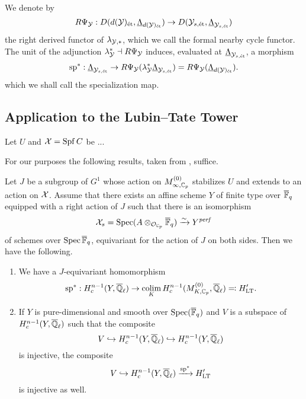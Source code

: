 \documentclass[../main.tex]{subfiles}
\begin{document}
\begin{defi}\label{def:FormalNearbyCycleFunctor}
  We denote by
  \begin{equation*}
    R \Psi_{\mathcal{Y}}: D(d(\mathcal{Y})_{\textnormal{\'et}}, {\underline \Lambda_{d(\mathcal{Y})_{\textnormal{\'et}}}}) \to
    D(\mathcal{Y}_{s, \textnormal{\'et}},{\underline \Lambda_{\mathcal{Y}_{s, \textnormal{\'et}}}})
  \end{equation*}
  the right derived functor of $\lambda_{\mathcal{Y},*}$, which we call the formal nearby
  cycle functor. The unit of the adjunction $\lambda_{\mathcal{Y}}^* \dashv 
  R \Psi_{\mathcal{Y}}$ induces, evaluated at $\underline \Lambda_{\mathcal{Y}_{s, \textnormal{\'et}}}$, a morphism
  \begin{equation*}
    \mathrm{sp}^* : \underline \Lambda_{\mathcal{Y}_{s, \textnormal{\'et}}} \to 
    R \Psi_{\mathcal{Y}}( \lambda_{\mathcal{Y}}^* \underline \Lambda_{\mathcal{Y}_{s, \textnormal{\'et}}}) = 
    R \Psi_{\mathcal{Y}}(\underline \Lambda_{d(\mathcal{Y})_{\textnormal{\'et}}}).
  \end{equation*}
  which we shall call the specialization map.
\end{defi}


\subsection{Application to the Lubin--Tate Tower} %
\label{sub:Application to the Lubin--Tate Tower}
Let $U$ and $\mathcal{X} = \operatorname{Spf} C$ be ...

For our purposes the following results, taken from \cite[Corollary
4.6]{mieda2016geometric}, suffice.
\begin{thm}\label{thm:MiedaAppliedToLTT}
  Let $J$ be a subgroup of $G^1$ whose action on $M_{\infty, {\mathbb{C}_p}}^{(0)}$ 
  stabilizes $U$ and extends to an action on $\mathcal{X}$. Assume that there exists an
  affine scheme $Y$ of finite type over ${\overline {\mathbb{F}}_q}$ equipped with a right action of 
  $J$ such that there is an isomorphism
  \begin{equation*}
    \mathcal{X}_s = \operatorname{Spec}(A \otimes_{\mathcal{O}_{\mathbb{C}_p}} {\overline {\mathbb{F}}_q}) \xrightarrow{\sim} Y^{\mathit{perf}}
  \end{equation*}
  of schemes over $\operatorname{Spec} {\overline {\mathbb{F}}_q}$, equivariant for the action of $J$ on both sides.
  Then we have the following.
  \begin{enumerate}
    \item We have a $J$-equivariant homomorphism
      \begin{equation*}
        \mathrm{sp}^*: H_c^{n-1}(Y, \overline {\mathbb{Q}}_\ell) \to \operatorname*{colim}_K H_c^{n-1}
        (M_{K, {\mathbb{C}_p}}^{(0)}, \overline {\mathbb{Q}}_\ell) \eqcolon H_{\mathrm{LT}}'.
      \end{equation*}
    \item If $Y$ is pure-dimensional and smooth over $\operatorname{Spec}({\overline {\mathbb{F}}_q})$
      and $V$ is a subspace of $H^{n-1}_c(Y, \overline {\mathbb{Q}}_\ell)$ such that the
      composite 
      $$V \hookrightarrow H^{n-1}_c(Y, \overline {\mathbb{Q}}_\ell) \hookrightarrow H^{n-1}_c(Y, \overline {\mathbb{Q}}_\ell)$$
      is injective, the composite
      \begin{equation*}
        V \hookrightarrow H^{n-1}_c(Y, \overline {\mathbb{Q}}_\ell) \xrightarrow{\mathrm{sp}^*} H_{\mathrm{LT}}'
      \end{equation*}
      is injective as well.
  \end{enumerate}
\end{thm}


\end{document}
